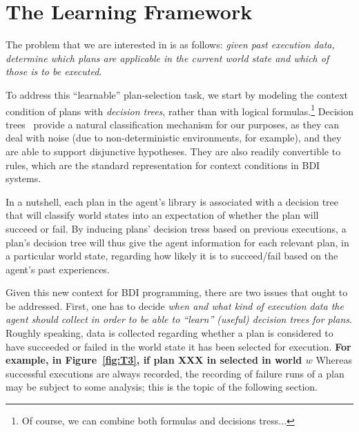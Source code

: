 \section{The Learning Framework}\label{sec:framework}


The problem that we are interested in is as follows: \emph{given past execution
data, determine which plans are applicable in the current world state and which
of those is to be executed}.


To address this ``learnable'' plan-selection task, we start by modeling the
context condition of plans with \emph{decision trees}, rather than with logical
formulas.\footnote{Of course, we can combine both formulas and decisions
tress...}
Decision trees~\cite{Mitchell97:ML}  provide a natural classification mechanism
for our purposes, as they can deal with noise (due to non-deterministic
environments, for example), and they are able to support disjunctive hypotheses.
They are also readily convertible to rules, which are the standard representation
for context conditions in BDI systems.




In a nutshell, each plan in the agent's library is associated with a decision
tree that will classify world states into an expectation of whether the plan will
succeed or fail. By inducing plans' decision tress based on previous executions,
a plan's decision tree will thus give the agent information for each relevant
plan, in a particular world state, regarding how likely it is to succeed/fail
based on the agent's past experiences.



Given this new context for BDI programming, there are two issues that ought to be
addressed.
First, one has to decide \emph{when and what kind of execution data the agent should
collect in order to be able to ``learn'' (useful) decision trees for plans}.
Roughly speaking, data is collected regarding whether a plan is considered to
have succeeded or failed in the world state it has been selected for execution.
\textbf{For example, in Figure~\ref{fig:T3}, if plan XXX in selected in world
$w$} %
Whereas successful executions are always recorded, the recording of failure runs
of a plan may be subject to some analysis; this is the topic of the following section.



